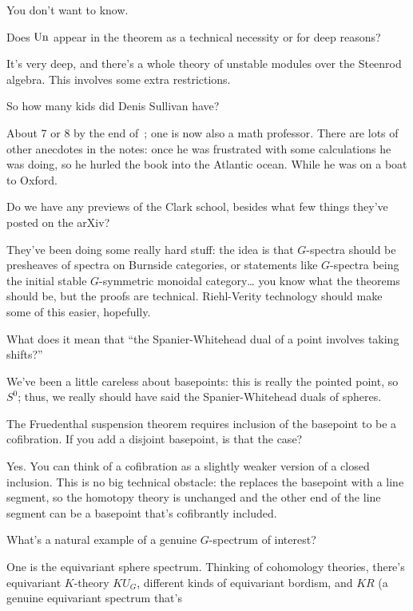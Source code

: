 You don't want to know.
\begin{ques}
Does $\operatorname{Un}$ appear in the theorem as a technical necessity or for deep reasons?
\end{ques}
It's very deep, and there's a whole theory of unstable modules over the Steenrod algebra. This involves some extra
restrictions.
\begin{ques}
So how many kids did Denis Sullivan have?
\end{ques}
About 7 or 8 by the end of~\cite{MITNotes}; one is now also a math professor. There are lots of other anecdotes in
the notes: once he was frustrated with some calculations he was doing, so he hurled the book into the Atlantic
ocean. While he was on a boat to Oxford.
\begin{ques}
Do we have any previews of the Clark school, besides what few things they've posted on the arXiv?
\end{ques}
They've been doing some really hard stuff: the idea is that $G$-spectra should be presheaves of spectra on Burnside
categories, or statements like $G$-spectra being the initial stable $G$-symmetric monoidal category\dots{} you know
what the theorems should be, but the proofs are technical. Riehl-Verity technology should make some of this easier,
hopefully.
\begin{ques}
What does it mean that ``the Spanier-Whitehead dual of a point involves taking shifts?''
\end{ques}
We've been a little careless about basepoints: this is really the pointed point, so $S^0$; thus, we really should
have said the Spanier-Whitehead duals of spheres.
\begin{ques}
The Fruedenthal suspension theorem requires inclusion of the basepoint to be a cofibration. If you add a disjoint
basepoint, is that the case?
\end{ques}
Yes. You can think of a cofibration as a slightly weaker version of a closed inclusion. This is no big technical
obstacle: the  replaces the basepoint with a line segment, so the homotopy theory is
unchanged and the other end of the line segment can be a basepoint that's cofibrantly included.
\begin{ques}
What's a natural example of a genuine $G$-spectrum of interest?
\end{ques}
One is the equivariant sphere spectrum. Thinking of cohomology theories, there's equivariant $K$-theory
$\mathit{KU}_G$, different kinds of equivariant bordism, and $\mathit{KR}$ (a genuine equivariant spectrum that's
